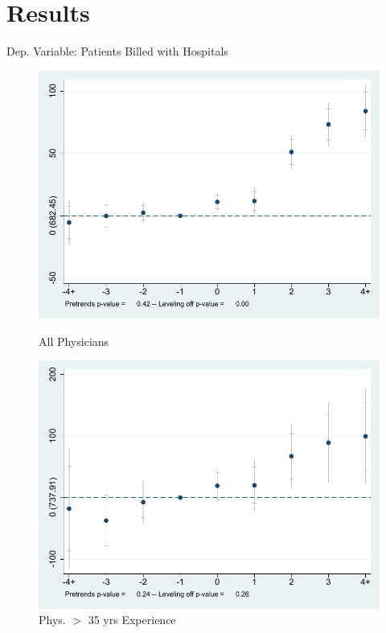 \documentclass[10pt]{beamer}
\begin{document}
\section{Results}


\begin{frame}{Dep. Variable: Patients Billed with Hospitals}
\begin{figure}[ht]
        \begin{minipage}[b]{0.47\linewidth}
            \centering
            \includegraphics[width=\textwidth]{Objects/xtevent_fullsample.pdf}
            \caption{\small All Physicians\\}
        \end{minipage}
        \hspace{0.2cm}
        \begin{minipage}[b]{0.47\linewidth}
            \centering
            \includegraphics[width=\textwidth]{Objects/xtevent_oldsample.pdf}
            \caption{\small Phys. $>$ 35 yrs Experience}
        \end{minipage}
    \end{figure}
\end{frame}
\end{document}
